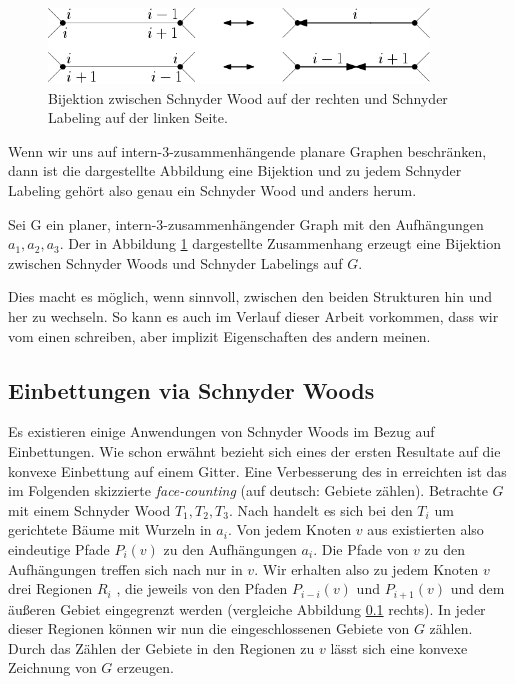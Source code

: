 \begin{figure}[h]
	\centering
  \includegraphics[width=0.9\textwidth]{schnyder_bij.png}
	\caption{Bijektion zwischen Schnyder Wood auf der rechten und Schnyder Labeling auf der linken Seite.}
	\label{schnyder_bij}
\end{figure}

Wenn wir uns auf intern-3-zusammenhängende planare Graphen beschränken, dann ist die dargestellte Abbildung eine Bijektion und zu jedem Schnyder Labeling gehört also genau ein Schnyder Wood und anders herum. 

\begin{theorem}
Sei G ein planer, intern-3-zusammenhängender Graph mit den Aufhängungen $a_1,a_2,a_3$. Der in Abbildung \ref{schnyder_bij} dargestellte Zusammenhang erzeugt eine Bijektion zwischen Schnyder Woods und Schnyder Labelings auf $G$.
\end{theorem}

Dies macht es möglich, wenn sinnvoll, zwischen den beiden Strukturen hin und her zu wechseln. So kann es auch im Verlauf dieser Arbeit vorkommen, dass wir vom einen schreiben, aber implizit Eigenschaften des andern meinen.

\subsection{Einbettungen via Schnyder Woods}\label{face_counting}

Es existieren einige Anwendungen von Schnyder Woods im Bezug auf Einbettungen. Wie schon erwähnt bezieht sich eines der ersten Resultate auf die konvexe Einbettung auf einem Gitter. Eine Verbesserung des in \cite{schnyder90} erreichten ist das im Folgenden skizzierte \textit{face-counting} \cite{felsner01} (auf deutsch: Gebiete zählen). Betrachte $G$ mit einem Schnyder Wood $T_1,T_2,T_3$. Nach \cite[Korollar 2.5]{felsner04} handelt es sich bei den $T_i$ um gerichtete Bäume mit Wurzeln in $a_i$. Von jedem Knoten $v$ aus existierten also eindeutige Pfade $P_i(v)$ zu den Aufhängungen $a_i$. Die Pfade von $v$ zu den Aufhängungen treffen sich nach \cite[Lemma 2.4]{felsner04} nur in $v$. Wir erhalten also zu jedem Knoten $v$ drei Regionen $R_i$ , die jeweils von den Pfaden $P_{i-i}(v)$ und $P_{i+1}(v)$ und dem äußeren Gebiet eingegrenzt werden (vergleiche Abbildung \ref{face_counting} rechts). In jeder dieser Regionen können wir nun die eingeschlossenen Gebiete von $G$ zählen. Durch das Zählen der Gebiete in den Regionen zu $v$ lässt sich eine konvexe Zeichnung von $G$ erzeugen.

